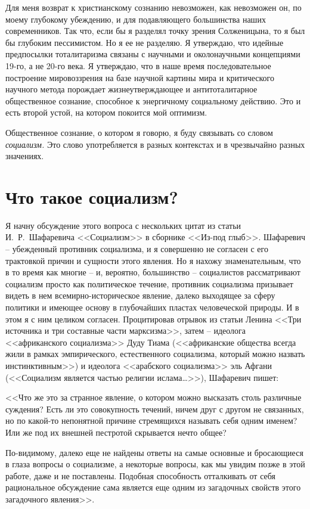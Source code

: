 \documentclass{book}
\begin{document}
Для меня возврат к христианскому сознанию невозможен, как невозможен он, по моему глубокому убеждению, и для подавляющего большинства наших современников. Так что, если бы я разделял точку зрения Солженицына, то я был бы глубоким пессимистом. Но я ее не разделяю. Я утверждаю, что идейные предпосылки тоталитаризма связаны с научными и околонаучными концепциями 19-го, а не 20-го века. Я утверждаю, что в наше время последовательное построение мировоз­зрения на базе научной картины мира и критического научного метода порождает жизнеутверждающее и антитоталитарное общественное сознание, способное к энергичному социальному действию. Это и есть второй устой, на котором покоится мой оптимизм.

Общественное сознание, о котором я говорю, я буду связывать со словом \textit{социализм.}  Это слово употребляется в разных контекстах и в чрезвычайно разных значениях.

\section{Что такое социализм?}

Я начну обсуждение этого вопроса с нескольких цитат из статьи И.~Р.~Шафаревича <<Социализм>> в сборнике <<Из-под глыб>>. Шафаревич -- убежденный противник социализма, и я совершенно не согласен с его трактовкой причин и сущности этого явления. Но я нахожу знаменательным, что в то время как многие -- и, вероятно, большинство -- социалистов рассматривают социализм просто как политическое течение, противник социализма призывает видеть в нем всемирно-историческое явление, далеко выходящее за сферу политики и имеющее основу в глубочайших пластах человеческой природы. И в этом я с ним целиком согласен.
Процитировав отрывок из статьи Ленина <<Три источника и три составные части марксизма>>, затем -- идеолога <<африканского социализма>> Дуду Тиама (<<африканские общества всегда жили в рамках эмпирического, естественного социализма, который можно назвать инстинктивным>>) и идеолога <<арабского социализма>> эль Афгани (<<Социализм является частью религии ислама\ldots>>), Шафаревич пишет:

<<Что же это за странное явление, о котором можно высказать столь различные суждения? Есть ли это совокупность течений, ничем друг с другом не связанных, но по какой-то непо­нятной причине стремящихся называть себя одним именем? Или же под их внешней пестротой скрывается нечто общее?

По-видимому, далеко еще не найдены ответы на самые основные и бросающиеся в глаза вопросы о социализме, а некоторые вопросы, как мы увидим позже в этой работе, даже и не поставлены. Подобная способность отталкивать от себя рациональное обсуждение сама является еще одним из загадочных свойств этого загадочного явления>>.
\end{document}

